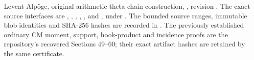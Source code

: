 Levent Alp\"oge, original arithmetic theta-chain construction,
, revision
.
The exact source interfaces are
,
,
,
,
, and
,
under .
The bounded source ranges, immutable blob identities and SHA-256
hashes are recorded in
.
The previously established ordinary CM moment, support, hook-product
and incidence proofs are the repository's recovered Sections 49--60;
their exact artifact hashes are retained by the same certificate.
